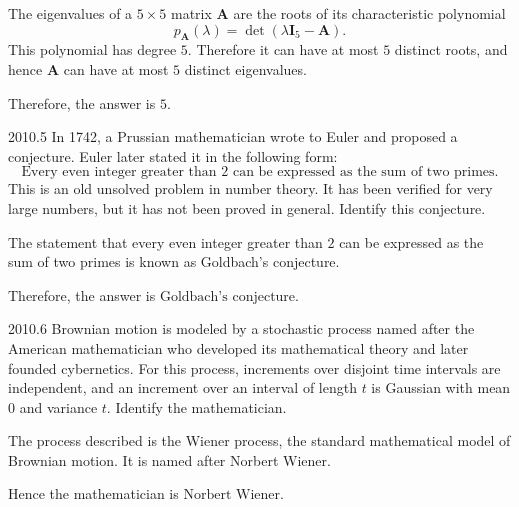     \begin{solution}
        The eigenvalues of a $5\times 5$ matrix $\mathbf{A}$ are the roots of its characteristic
        polynomial
        \[
            p_{\mathbf{A}}(\lambda)=\det(\lambda\mathbf{I}_5-\mathbf{A}).
        \]
        This polynomial has degree $5$. Therefore it can have at most $5$ distinct roots, and hence
        $\mathbf{A}$ can have at most $5$ distinct eigenvalues.

        Therefore, the answer is $\boxed{5}$.
    \end{solution}

    \begin{pastproblem}{2010.5}
        In 1742, a Prussian mathematician wrote to Euler and proposed a conjecture. Euler later
        stated it in the following form:
        \[
            \text{Every even integer greater than }2\text{ can be expressed as the sum of two primes.}
        \]
        This is an old unsolved problem in number theory. It has been verified for very large
        numbers, but it has not been proved in general. Identify this conjecture.
    \end{pastproblem}

    \begin{solution}
        The statement that every even integer greater than $2$ can be expressed as the sum of two
        primes is known as Goldbach's conjecture.

        Therefore, the answer is $\boxed{\text{Goldbach's conjecture}}$.
    \end{solution}

    \begin{pastproblem}{2010.6}
        Brownian motion is modeled by a stochastic process named after the
        American mathematician who developed its mathematical theory and later
        founded cybernetics. For this process, increments over disjoint time
        intervals are independent, and an increment over an interval of length
        $t$ is Gaussian with mean $0$ and variance $t$. Identify the
        mathematician.
    \end{pastproblem}

    \begin{solution}
        The process described is the Wiener process, the standard mathematical
        model of Brownian motion. It is named after Norbert Wiener.

        Hence the mathematician is $\boxed{\text{Norbert Wiener}}$.
    \end{solution}

